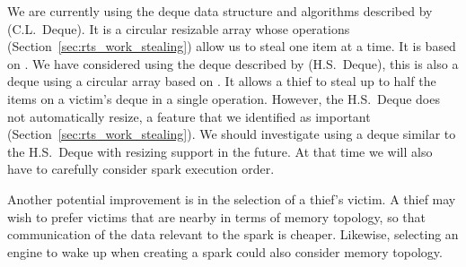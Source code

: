 We are currently using the deque data structure and algorithms described by
\citet{Chase_2005_wsdeque} (C.L.\ Deque).
It is a circular resizable array whose operations
(Section~\ref{sec:rts_work_stealing})
allow us to steal one item at a time.
It is based on \citet{arora:1998:work-stealing}.
We have considered using the deque described by
\citet{hendler:2002:stealhalf} (H.S.\ Deque),
this is also a deque using a circular array
based on \citet{arora:1998:work-stealing}.
It allows a thief to steal up to half the items on a victim's deque
in a single operation.
However, the H.S.\ Deque does not automatically resize,
a feature that we identified as important (Section~\ref{sec:rts_work_stealing}).
We should investigate using a deque similar to the H.S.\ Deque with resizing
support in the future.
At that time we will also have to carefully consider spark execution order.

Another potential improvement is in the selection of a thief's victim.
A thief may wish to prefer victims that are nearby in terms of memory
topology, so that communication of the data relevant to the spark is
cheaper.
Likewise, selecting an engine to wake up when creating a spark could also
consider memory topology.

